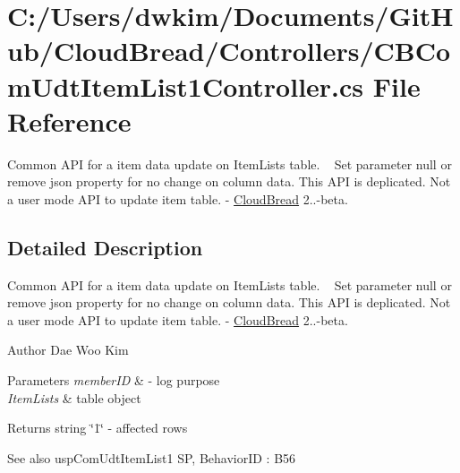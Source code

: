 \hypertarget{a00133}{}\section{C\+:/\+Users/dwkim/\+Documents/\+Git\+Hub/\+Cloud\+Bread/\+Controllers/\+C\+B\+Com\+Udt\+Item\+List1\+Controller.cs File Reference}
\label{a00133}


Common A\+PI for a item data update on Item\+Lists table. ~\newline
Set parameter null or remove json property for no change on column data.  This A\+PI is deplicated. Not a user mode A\+PI to update item table. -\/ \hyperlink{a00217}{Cloud\+Bread} 2..-\/beta.  




\subsection{Detailed Description}
Common A\+PI for a item data update on Item\+Lists table. ~\newline
Set parameter null or remove json property for no change on column data.  This A\+PI is deplicated. Not a user mode A\+PI to update item table. -\/ \hyperlink{a00217}{Cloud\+Bread} 2..-\/beta. 

\begin{DoxyAuthor}{Author}
Dae Woo Kim 
\end{DoxyAuthor}

\begin{DoxyParams}{Parameters}
{\em member\+ID} & -\/ log purpose \\
\hline
{\em Item\+Lists} & table object \\
\hline
\end{DoxyParams}
\begin{DoxyReturn}{Returns}
string \char`\"{}1\char`\"{} -\/ affected rows 
\end{DoxyReturn}
\begin{DoxySeeAlso}{See also}
usp\+Com\+Udt\+Item\+List1 SP, Behavior\+ID \+: B56 
\end{DoxySeeAlso}
